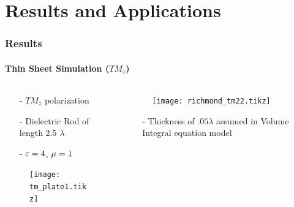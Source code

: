 \documentclass[mathserif,16pt,xcolor=table]{beamer}
\begin{document}
\section{Results and Applications}
\begin{frame}
  \frametitle{Results}
  \framesubtitle{Thin Sheet Simulation ($TM_z$)}
  \begin{columns}[T] %
    \begin{column}{.5\textwidth}
      \begin{itemize}
        \item[-]{$TM_z$ polarization}
        \item[-]{Dielectric Rod of length 2.5 $\lambda$}
        \item[-]{$\varepsilon = 4$, $\mu = 1$}
      \end{itemize}
      \begin{figure}
        \centering
        \texttt{[image: tm\_plate1.tikz]}
        \label{fig:tm_plate}
      \end{figure}
    \end{column}
    \begin{column}[T]{.5\textwidth}
      \begin{figure} \vspace*{-1cm}
        \texttt{[image: richmond\_tm22.tikz]}
        \label{fig:TM_rcs}
      \end{figure}
      \begin{itemize}
        \item[-]{Thickness of $.05 \lambda$ assumed in Volume Integral equation model}
      \end{itemize}
      \end{column}%
    \end{columns}
  \end{frame}
\end{document}
